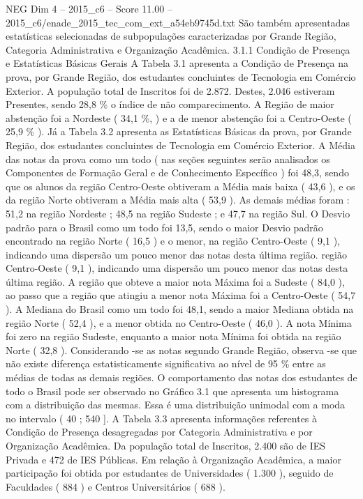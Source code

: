 \begin{textsample}{NEG Dim 4 – 2015\_c6 – Score 11.00 – 2015\_c6/enade\_2015\_tec\_com\_ext\_a54eb9745d.txt}
São também apresentadas estatísticas selecionadas de subpopulações caracterizadas por Grande Região, Categoria Administrativa e Organização Acadêmica. 3.1.1 Condição de Presença e Estatísticas Básicas Gerais A Tabela 3.1 apresenta a Condição de Presença na prova, por Grande Região, dos estudantes concluintes de Tecnologia em Comércio Exterior.
A população total de Inscritos foi de 2.872.
Destes, 2.046 estiveram Presentes, sendo 28,8 \% o índice de não comparecimento.
A Região de maior abstenção foi a Nordeste ( 34,1 \%, ) e a de menor abstenção foi a Centro-Oeste ( 25,9 \% ).
Já a Tabela 3.2 apresenta as Estatísticas Básicas da prova, por Grande Região, dos estudantes concluintes de Tecnologia em Comércio Exterior.
A Média das notas da prova como um todo ( nas seções seguintes serão analisados os Componentes de Formação Geral e de Conhecimento Específico ) foi 48,3, sendo que os alunos da região Centro-Oeste obtiveram a Média mais baixa ( 43,6 ), e os da região Norte obtiveram a Média mais alta ( 53,9 ).
As demais médias foram : 51,2 na região Nordeste ; 48,5 na região Sudeste ; e 47,7 na região Sul.
O Desvio padrão para o Brasil como um todo foi 13,5, sendo o maior Desvio padrão encontrado na região Norte ( 16,5 ) e o menor, na região Centro-Oeste ( 9,1 ), indicando uma dispersão um pouco menor das notas desta última região. região Centro-Oeste ( 9,1 ), indicando uma dispersão um pouco menor das notas desta última região.
A região que obteve a maior nota Máxima foi a Sudeste ( 84,0 ), ao passo que a região que atingiu a menor nota Máxima foi a Centro-Oeste ( 54,7 ).
A Mediana do Brasil como um todo foi 48,1, sendo a maior Mediana obtida na região Norte ( 52,4 ), e a menor obtida no Centro-Oeste ( 46,0 ).
A nota Mínima foi zero na região Sudeste, enquanto a maior nota Mínima foi obtida na região Norte ( 32,8 ).
Considerando -se as notas segundo Grande Região, observa -se que não existe diferença estatisticamente significativa ao nível de 95 \% entre as médias de todas as demais regiões.
O comportamento das notas dos estudantes de todo o Brasil pode ser observado no Gráfico 3.1 que apresenta um histograma com a distribuição das mesmas.
Essa é uma distribuição unimodal com a moda no intervalo ( 40 ; 540 ].
A Tabela 3.3 apresenta informações referentes à Condição de Presença desagregadas por Categoria Administrativa e por Organização Acadêmica.
Da população total de Inscritos, 2.400 são de IES Privada e 472 de IES Públicas.
Em relação à Organização Acadêmica, a maior participação foi obtida por estudantes de Universidades ( 1.300 ), seguido de Faculdades ( 884 ) e Centros Universitários ( 688 ).

\end{textsample}
